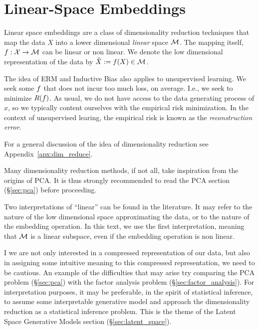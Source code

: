 \section{Linear-Space Embeddings}
\label{sec:dim_reduce_linear}

Linear space embeddings are a class of dimensionality reduction techniques that map the data $X$ into a lower dimensional \emph{linear} space $\mathcal{M}$. 
The mapping itself, $f: \mathcal{X} \to \mathcal{M}$ can be linear or non linear.
We denote the low dimensional representation of the data by $\hat{X}:=f(X) \in \mathcal{M}$.

The idea of ERM and Inductive Bias also applies to unsupervised learning.
We seek some $f$ that does not incur too much loss, on average. I.e., we seek to minimize $R(f)$.
As usual, we do not have access to the data generating process of $x$, so we typically content ourselves with the empirical risk minimization.
In the context of unsupervised learing, the empirical risk is known as the \emph{reconstruction error}.

For a general discussion of the idea of dimensionality reduction see Appendix~\ref{apx:dim_reduce}.

Many dimensionality reduction methods, if not all, take inspiration from the origins of PCA. 
It is thus strongly recommended to read the PCA section (\S\ref{sec:pca}) before proceeding.

\begin{remark}
\label{remark:linear}
	Two interpretations of ``linear'' can be found in the literature. It may refer to the nature of the low dimensional space approximating the data, or to the nature of the embedding operation. In this text, we use the first interpretation, meaning that $\mathcal{M}$ is a linear subspace, even if the embedding operation is non linear.
\end{remark}


\begin{remark}
I we are not only interested in a compressed representation of our data, but also in assigning some intuitive meaning to this compressed representation, we need to be cautious. 
An example of the difficulties that may arise try comparing the PCA problem (\S\ref{sec:pca}) with the factor analysis problem (\S\ref{sec:factor_analysis}).
For interpretation purposes, it may be preferable, in the spirit of statistical inference, to assume some interpretable generative model and approach the dimensionality reduction as a statistical inference problem.
This is the theme of the Latent Space Generative Models section (\S\ref{sec:latent_space}).
\end{remark}




